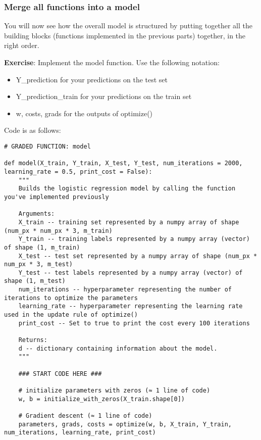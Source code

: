 {{\subsubsection{Merge all functions into a model}\label{sec:logistic_regression}

You will now see how the overall model is structured by putting together all the building blocks (functions implemented in the previous parts) together, in the right order.

{\textbf {Exercise}}: Implement the model function. Use the following notation:
\begin{itemize}
\item  Y\_prediction for your predictions on the test set
\item  Y\_prediction\_train for your predictions on the train set
\item  w, costs, grads for the outputs of optimize()
\end{itemize}

Code is as follows:
\begin{verbatim}
# GRADED FUNCTION: model

def model(X_train, Y_train, X_test, Y_test, num_iterations = 2000, learning_rate = 0.5, print_cost = False):
    """
    Builds the logistic regression model by calling the function you've implemented previously
    
    Arguments:
    X_train -- training set represented by a numpy array of shape (num_px * num_px * 3, m_train)
    Y_train -- training labels represented by a numpy array (vector) of shape (1, m_train)
    X_test -- test set represented by a numpy array of shape (num_px * num_px * 3, m_test)
    Y_test -- test labels represented by a numpy array (vector) of shape (1, m_test)
    num_iterations -- hyperparameter representing the number of iterations to optimize the parameters
    learning_rate -- hyperparameter representing the learning rate used in the update rule of optimize()
    print_cost -- Set to true to print the cost every 100 iterations
    
    Returns:
    d -- dictionary containing information about the model.
    """
    
    ### START CODE HERE ###
    
    # initialize parameters with zeros (≈ 1 line of code)
    w, b = initialize_with_zeros(X_train.shape[0])

    # Gradient descent (≈ 1 line of code)
    parameters, grads, costs = optimize(w, b, X_train, Y_train, num_iterations, learning_rate, print_cost)
    

\end{verbatim}}}
